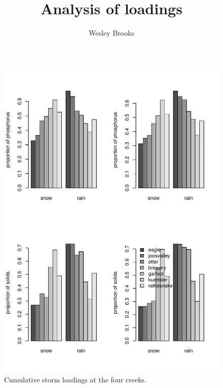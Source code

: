 \documentclass[12pt]{article}
\title{Analysis of loadings}
\author{Wesley Brooks}
\date{}                                           %
\begin{document}
\maketitle














\begin{figure}[h!]
    \begin{center}
\includegraphics{loadings-fig2}
    \end{center}
    \vspace{-10mm}
    \caption{Cumulative storm loadings at the four creeks.\label{bars}}
\end{figure}
\end{document}
